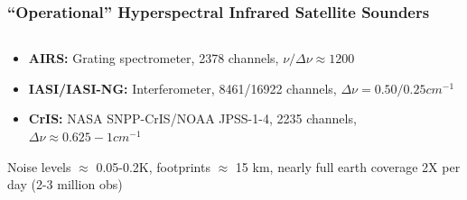 \documentclass[10pt,t]{beamer}
\begin{document}
\begin{frame}
\frametitle{``Operational'' Hyperspectral Infrared Satellite Sounders}
\begin{columns}[T]

  \begin{column}{0.75\columnwidth}
  \begin{itemize}
  \item \textbf{AIRS:} Grating spectrometer, 2378 channels, $\nu / \Delta \nu \approx 1200$
  \item \textbf{IASI/IASI-NG:} Interferometer, 8461/16922 channels, $\Delta \nu = 0.50/0.25 cm^{-1}$
  \item \textbf{CrIS: }NASA SNPP-CrIS/NOAA JPSS-1-4, 2235 channels, $\Delta \nu \approx 0.625-1 cm^{-1}$
  \end{itemize}

\begin{small}  
Noise levels $\approx$ 0.05-0.2K, footprints $\approx$ 15 km, nearly full earth coverage 2X per day (2-3 million obs)
\end{small}  

\end{column}


\end{columns}
\end{frame}
\end{document}
